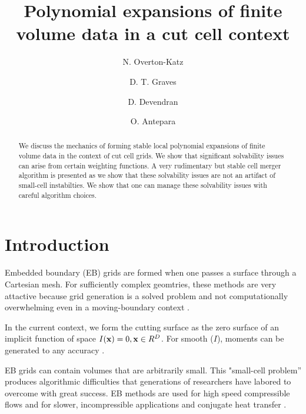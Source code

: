 \documentclass{article}
\newcommand{\xbold}{{\bf x}}
\begin{document}
\title{Polynomial expansions of finite volume data in a cut cell context}
\author{N. Overton-Katz \footnotemark[1]
   \and D. T. Graves    \footnotemark[1]
   \and D. Devendran    \footnotemark[2]
   \and O. Antepara    \footnotemark[1]}

\maketitle

\begin{abstract}

  We discuss the mechanics of forming stable local polynomial
  expansions of finite volume data in the context of cut cell grids.
  We show that significant solvability issues can arise from certain weighting
  functions.    A very rudimentary but stable cell merger algorithm is
  presented as we show that these solvability issues are not 
  an artifact of small-cell instabilties.    We show that one can
  manage these solvability issues with careful algorithm choices.
  
\end{abstract}


\section{Introduction}

Embedded boundary (EB) grids are formed when one passes a surface
through a Cartesian mesh.    For sufficiently complex geomtries, these methods
are very attactive because grid generation is a solved problem
and not computationally overwhelming even in a moving-boundary context
\cite{MillerTrebotich2012}.

In the current context, we form the cutting surface as the zero
surface of an implicit function  of space
$I(\xbold) = 0, \xbold \in R^D$.
For smooth ($I$),  moments can be generated to any
accuracy \cite{Schwartz2015}.

EB grids can contain volumes that are arbitrarily small.    This
"small-cell problem'' produces
algorithmic difficulties that generations of researchers have labored
to overcome with great success.   EB methods are used for high speed
compressible flows \cite{Colella2006, Graves2013} and for
slower, incompressible applications \cite{Trebotich2015} and conjugate
heat transfer \cite{Crockett2010}.
\end{document}
